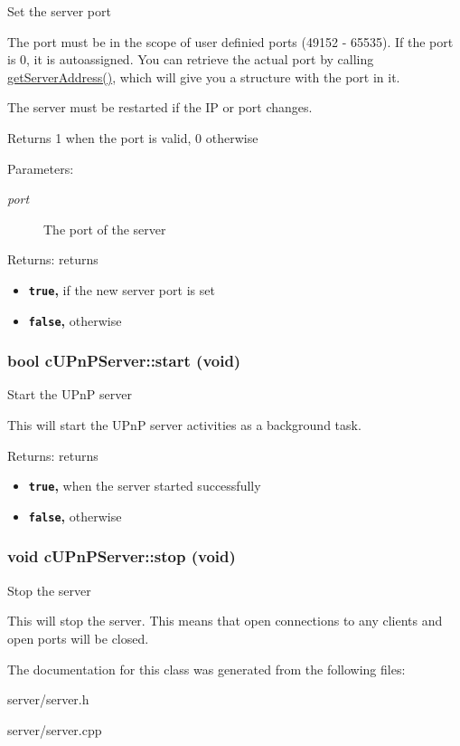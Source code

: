 Set the server port

The port must be in the scope of user definied ports (49152 - 65535). If the port is 0, it is autoassigned. You can retrieve the actual port by calling \hyperlink{classcUPnPServer_f938922eff48ca1035e88677e095c0c4}{getServerAddress()}, which will give you a structure with the port in it.

The server must be restarted if the IP or port changes.

Returns 1 when the port is valid, 0 otherwise

\begin{Desc}
\item[Parameters:]
\begin{description}
\item[{\em port}]The port of the server \end{description}
\end{Desc}
\begin{Desc}
\item[Returns:]returns\begin{itemize}
\item {\bf {\tt true},} if the new server port is set\item {\bf {\tt false},} otherwise \end{itemize}
\end{Desc}
\hypertarget{classcUPnPServer_811d90c5aadc75bc48670757def1c21e}{
\subsubsection[{start}]{\setlength{\rightskip}{0pt plus 5cm}bool cUPnPServer::start (void)}}
\label{classcUPnPServer_811d90c5aadc75bc48670757def1c21e}


Start the UPnP server

This will start the UPnP server activities as a background task.

\begin{Desc}
\item[Returns:]returns\begin{itemize}
\item {\bf {\tt true},} when the server started successfully\item {\bf {\tt false},} otherwise \end{itemize}
\end{Desc}
\hypertarget{classcUPnPServer_c5ecc7ef5d42db1fa136ff00b24d1289}{
\subsubsection[{stop}]{\setlength{\rightskip}{0pt plus 5cm}void cUPnPServer::stop (void)}}
\label{classcUPnPServer_c5ecc7ef5d42db1fa136ff00b24d1289}


Stop the server

This will stop the server. This means that open connections to any clients and open ports will be closed. 

The documentation for this class was generated from the following files:\begin{CompactItemize}
\item 
server/server.h\item 
server/server.cpp\end{CompactItemize}
